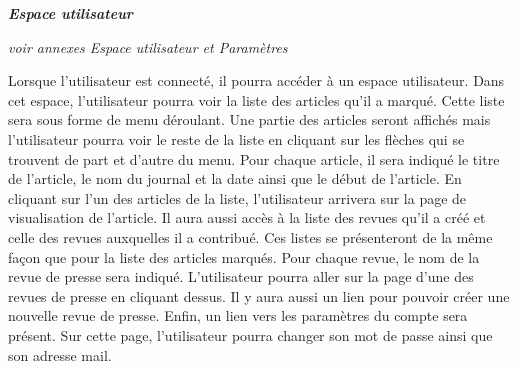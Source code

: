 \textbf{\textit{Espace utilisateur}}

\textit{voir annexes Espace utilisateur et Paramètres}


Lorsque l'utilisateur est connecté, il pourra accéder à un espace utilisateur. Dans cet espace, l'utilisateur pourra voir la liste des articles qu'il a marqué. Cette liste sera sous forme de menu déroulant. Une partie des articles seront affichés mais l'utilisateur pourra voir le reste de la liste en cliquant sur les flèches qui se trouvent de part et d'autre du menu. Pour chaque article, il sera indiqué le titre de l'article, le nom du journal et la date ainsi que le début de l'article. En cliquant sur l'un des articles de la liste, l'utilisateur arrivera sur la page de visualisation de l'article.
Il aura aussi accès à la liste des revues qu'il a créé et celle des revues auxquelles il a contribué. Ces listes se présenteront de la même façon que pour la liste des articles marqués. Pour chaque revue, le nom de la revue de presse sera indiqué. L'utilisateur pourra aller sur la page d'une des revues de presse en cliquant dessus.
Il y aura aussi un lien pour pouvoir créer une nouvelle revue de presse. 
Enfin, un lien vers les paramètres du compte sera présent.  Sur cette page, l'utilisateur pourra changer son mot de passe ainsi que son adresse mail.
